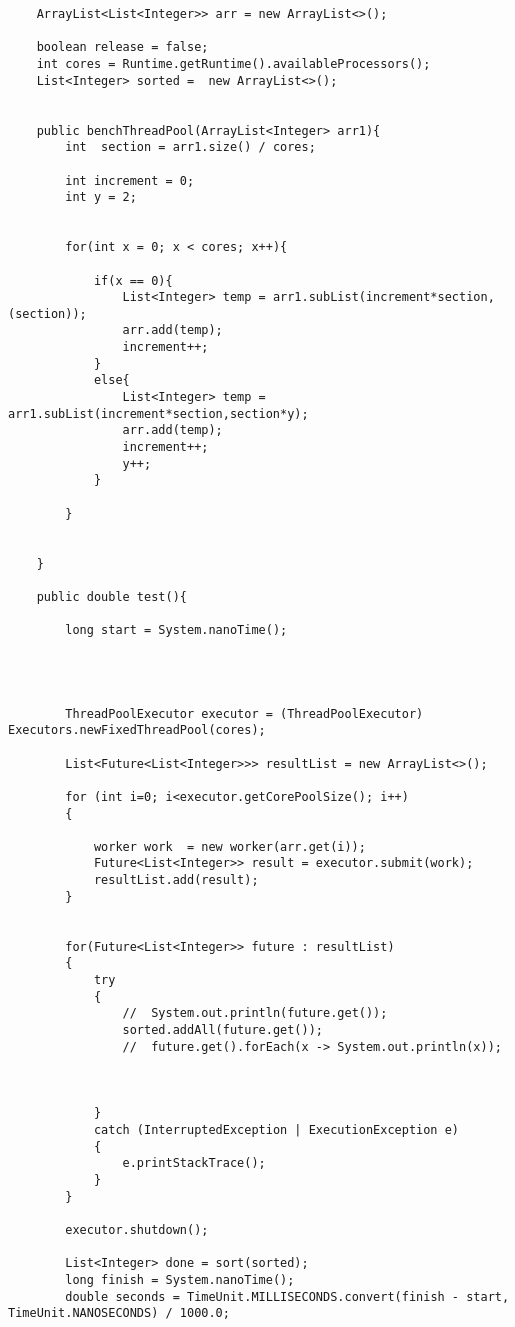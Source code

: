 \documentclass[11pt]{article}  %
\theoremstyle{definition}
\theoremstyle{remark}
\begin{document}
\begin{appendices}
\begin{lstlisting}
    ArrayList<List<Integer>> arr = new ArrayList<>();

    boolean release = false;
    int cores = Runtime.getRuntime().availableProcessors();
    List<Integer> sorted =  new ArrayList<>();


    public benchThreadPool(ArrayList<Integer> arr1){
        int  section = arr1.size() / cores;

        int increment = 0;
        int y = 2;


        for(int x = 0; x < cores; x++){

            if(x == 0){
                List<Integer> temp = arr1.subList(increment*section,(section));
                arr.add(temp);
                increment++;
            }
            else{
                List<Integer> temp = arr1.subList(increment*section,section*y);
                arr.add(temp);
                increment++;
                y++;
            }

        }
      

    }

    public double test(){

        long start = System.nanoTime();




        ThreadPoolExecutor executor = (ThreadPoolExecutor) Executors.newFixedThreadPool(cores);

        List<Future<List<Integer>>> resultList = new ArrayList<>();

        for (int i=0; i<executor.getCorePoolSize(); i++)
        {

            worker work  = new worker(arr.get(i));
            Future<List<Integer>> result = executor.submit(work);
            resultList.add(result);
        }


        for(Future<List<Integer>> future : resultList)
        {
            try
            {
                //  System.out.println(future.get());
                sorted.addAll(future.get());
                //  future.get().forEach(x -> System.out.println(x));



            }
            catch (InterruptedException | ExecutionException e)
            {
                e.printStackTrace();
            }
        }

        executor.shutdown();

        List<Integer> done = sort(sorted);
        long finish = System.nanoTime();
        double seconds = TimeUnit.MILLISECONDS.convert(finish - start, TimeUnit.NANOSECONDS) / 1000.0;


\end{lstlisting}
\end{appendices}
\end{document}
